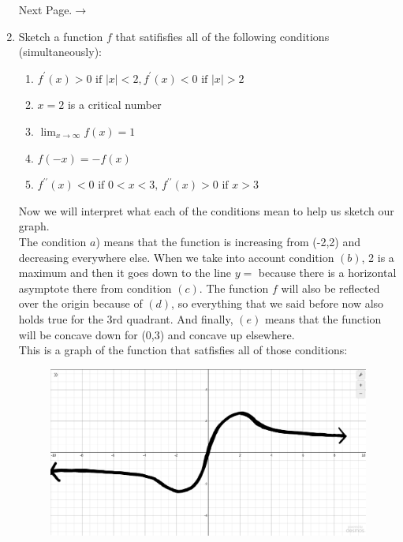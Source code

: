 \documentclass{article}
\begin{document}
\begin{enumerate}[label=\textbf{(13.\arabic*)}]
\par
Next Page.$ \rightarrow$
\newpage
\item Sketch a function $f$ that satifisfies all of the following conditions (simultaneously):
\begin{enumerate}[label=(\alph*)]
\item $f^\prime(x) > 0 \text{ if } |x| < 2, f^\prime(x) < 0 \text{ if }|x| > 2$
\item $x=2$ is a critical number
\item $\lim_{x \to \infty} {f(x)} = 1$
\item $f(-x)=-f(x)$
\item $f^{\prime\prime}(x) < 0 \text{ if } 0<x<3\text{, }f^{\prime\prime}(x)>0\text{ if }x>3$ \\
\newline
\end{enumerate}
Now we will interpret what each of the conditions mean to help us sketch our graph. \\
The condition $a$) means that the function is increasing from (-2,2) and decreasing everywhere else. When we take into account condition $(b)$, 2 is a maximum and then it goes down to the line $y=$ because there is a horizontal asymptote there from condition $(c)$. The function $f$ will also be reflected over the origin because of $(d)$, so everything that we said before now also holds true for the 3rd quadrant. And finally, $(e)$ means that the function will be concave down for (0,3) and concave up elsewhere. \\ This is a graph of the function that satfisfies all of those conditions: \\
\par
\begin{figure}[H]
\centering
\includegraphics[scale=.2]{ink}
\end{figure}


\end{enumerate}
\end{document}
